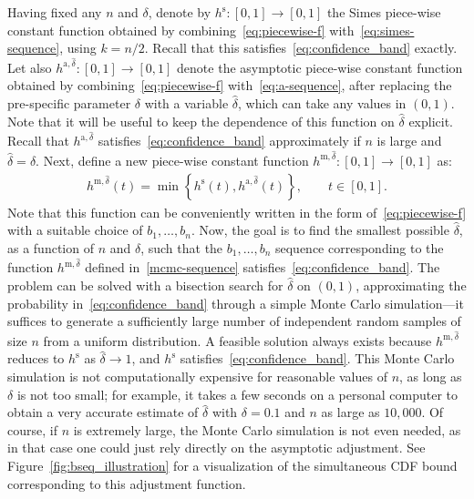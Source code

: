 \documentclass[11pt]{article}
\begin{document}
Having fixed any $n$ and $\delta$, denote by $h^{\mathrm{s}}: [0,1] \to [0,1]$ the Simes piece-wise constant function obtained by combining~\eqref{eq:piecewise-f} with~\eqref{eq:simes-sequence}, using $k=n/2$. Recall that this satisfies~\eqref{eq:confidence_band} exactly.
Let also $h^{\mathrm{a},\hat{\delta}}: [0,1] \to [0,1]$ denote the asymptotic piece-wise constant function obtained by combining~\eqref{eq:piecewise-f} with~\eqref{eq:a-sequence}, after replacing the pre-specific parameter $\delta$ with a variable $\hat{\delta}$, which can take any values in $(0,1)$. Note that it will be useful to keep the dependence of this function on $\hat{\delta}$ explicit. 
Recall that $h^{\mathrm{a},\hat{\delta}}$ satisfies~\eqref{eq:confidence_band} approximately if $n$ is large and $\hat{\delta} = \delta$.
Next, define a new piece-wise constant function $h^{\mathrm{m},\hat{\delta}}: [0,1] \to [0,1]$ as:
\begin{align} \label{mcmc-sequence}
  h^{\mathrm{m},\hat{\delta}}(t) = \min \left\{ h^{\mathrm{s}}(t), h^{\mathrm{a},\hat{\delta}}(t)\right\},  \qquad t\in [0, 1].
\end{align}
Note that this function can be conveniently written in the form of~\eqref{eq:piecewise-f} with a suitable choice of $b_1,\ldots,b_n$.
Now, the goal is to find the smallest possible $\hat{\delta}$, as a function of $n$ and $\delta$, such that the $b_1,\ldots,b_n$ sequence corresponding to the function $h^{\mathrm{m},\hat{\delta}}$ defined in~\eqref{mcmc-sequence} satisfies~\eqref{eq:confidence_band}. The problem can be solved with a bisection search for $\hat{\delta}$ on $(0,1)$, approximating the probability in~\eqref{eq:confidence_band} through a simple Monte Carlo simulation---it suffices to generate a sufficiently large number of independent random samples of size $n$ from a uniform distribution. A feasible solution always exists because $h^{\mathrm{m},\hat{\delta}}$ reduces to $h^{\mathrm{s}}$ as $\hat{\delta} \to 1$, and $h^{\mathrm{s}}$ satisfies~\eqref{eq:confidence_band}. This Monte Carlo simulation is not computationally expensive for reasonable values of $n$, as long as $\delta$ is not too small; for example, it takes a few seconds on a personal computer to obtain a very accurate estimate of $\hat{\delta}$ with $\delta=0.1$ and $n$ as large as $10,000$. Of course, if $n$ is extremely large, the Monte Carlo simulation is not even needed, as in that case one could just rely directly on the asymptotic adjustment.
See Figure~\ref{fig:bseq_illustration} for a visualization of the simultaneous CDF bound corresponding to this adjustment function.
\end{document}
